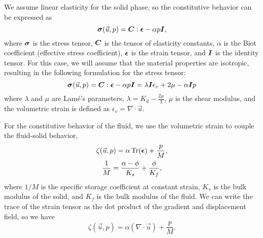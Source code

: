 We assume linear elasticity for the solid phase, so the constitutive behavior can be expressed
as
\begin{equation}
  \bm{\sigma}(\vec{u},p) = \bm{C} : \bm{\epsilon} - \alpha p \bm{I},
\end{equation}
where $\bm{\sigma}$ is the stress tensor, $\bm{C}$ is the
tensor of elasticity constants, $\alpha$ is the Biot coefficient
(effective stress coefficient), $\bm{\epsilon}$ is the strain
tensor, and $\bm{I}$ is the identity tensor.  For this case, we
will assume that the material properties are isotropic, resulting in
the following formulation for the stress tensor:
\begin{equation}
    \bm{\sigma}(\vec{u},p) = \bm{C}:\bm{\epsilon} - \alpha p \bm{I}
                                           = \lambda \bm{I} \epsilon_{v} + 2 \mu - \alpha \bm{I} p
\end{equation}
where $\lambda$ and $\mu$ are Lam\'e's parameters,
$\lambda = K_{d} - \frac{2 \mu}{3}$, $\mu$ is the shear modulus, and
the volumetric strain is defined as
$\epsilon_{v} = \nabla \cdot \vec{u}$.

For the constitutive behavior of the fluid, we use the volumetric
strain to couple the fluid-solid behavior,
\begin{gather}
  \zeta(\vec{u},p) = \alpha \Tr({\tensor{\epsilon}}) + \frac{p}{M}, \\
%
  \frac{1}{M} = \frac{\alpha-\phi}{K_s} + \frac{\phi}{K_f},
\end{gather}
where $1/M$ is the specific storage coefficient at constant strain,
$K_s$ is the bulk modulus of the solid, and $K_f$ is the bulk modulus
of the fluid. We can write the trace of the strain tensor as the dot
product of the gradient and displacement field, so we have
\begin{equation}
  \zeta(\vec{u},p) = \alpha (\nabla \cdot \vec{u}) + \frac{p}{M}.
\end{equation}

